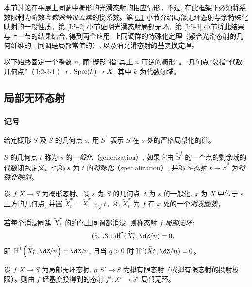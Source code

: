 本节讨论在平展上同调中概形的光滑态射的相应情形。不过, 在此框架下必须将系数限制为阶数\emph{与剩余特征互素}的挠系数。第 \ref{I:5-1} 小节介绍局部无环态射与余特殊化映射的一般性质。第 \ref{I:5-2} 小节证明光滑态射局部无环。第 \ref{I:5-3} 小节将此结果与上一节的结果结合, 得到两个应用: 上同调群的特殊化定理（紧合光滑态射的几何纤维的上同调是局部常值的）, 以及沿光滑态射的基变换定理。

以下始终固定一个整数 $n$, 而“概形”指“其上 $n$ 可逆的概形”。“几何点”总指“代数几何点”（\ref{I:2-3-1}）$x:\operatorname{Spec}(k)\to X$, 其中 $k$ 为代数闭域。

\subsection{局部无环态射}\label{I:5-1}

\subsubsection{记号}\label{I:5-1-1}

给定概形 $S$ 及 $S$ 的几何点 $s$, 用 $\widetilde S^s$ 表示 $S$ 在 $s$ 处的严格局部化的谱。

\begin{definition}\label{I:5-1-2}
$S$ 的几何点 $t$ 称为 $s$ 的\emph{一般化}（generization）, 如果它由 $\widetilde S^s$ 的一个点的剩余域的代数闭包定义。也称 $s$ 为 $t$ 的\emph{特殊化}（specialization）, 并称 $S$-态射 $t\to\widetilde S^s$ 为\emph{特殊化映射}。
\end{definition}

\begin{definition}\label{I:5-1-3}
设 $f:X\to S$ 为概形态射。设 $s$ 为 $S$ 的几何点, $t$ 为 $s$ 的一般化, $x$ 为 $X$ 中位于 $s$ 上方的几何点, 并置 $\widetilde X_t^x=\widetilde X^x\times_{\widetilde S^s}t$。称 $\widetilde X_t^x$ 为 $f$ 在 $x$ 处的一个\emph{消没圈簇}。

若每个消没圈簇 $\widetilde X_t^x$ 的约化上同调都消没, 则称态射 $f$ \emph{局部无环}:
\begin{equation*}\tag{5.1.3.1}\label{I:eq:5-1-3-1}
  \hat\h^\bullet(\widetilde X_t^x,\dZ/n) = 0\text{,}
\end{equation*}
即 $\h^0\left(\widetilde X_t^x,\dZ/n\right)=\dZ/n$, 且当 $q>0$ 时 $\h^q(\widetilde X_t^x,\dZ/n)=0$。
\end{definition}

\begin{lemma}\label{I:5-1-4}
设 $f:X\to S$ 为局部无环态射, $g:S'\to S$ 为拟有限态射（或拟有限态射的投射极限）。则由 $f$ 经基变换得到的态射 $f':X'\to S'$ 局部无环。
\end{lemma}

